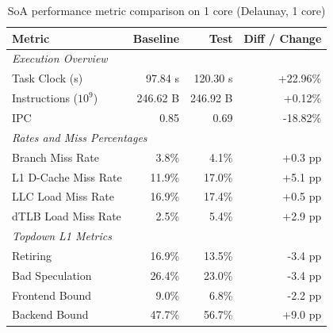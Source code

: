         \begin{table}[htbp]
      \centering
      \caption{SoA performance metric comparison on 1 core (Delaunay, 1 core)}
      \label{tab:perf_comparison_soa_delaunay_1core}
      \begin{tabular}{lrrr}
        \toprule
        \textbf{Metric} & \textbf{Baseline} & \textbf{Test} & \textbf{Diff / Change} \\
        \midrule
        \multicolumn{4}{l}{\textit{Execution Overview}} \\
        \quad Task Clock (s)           & 97.84 s   & 120.30 s   & +22.96\%   \\
        \quad Instructions ($10^9$)    & 246.62 B  & 246.92 B  & +0.12\%   \\
        \quad IPC                      & 0.85       & 0.69       & -18.82\%    \\
        \midrule
        \multicolumn{4}{l}{\textit{Rates and Miss Percentages}} \\
        \quad Branch Miss Rate         & 3.8\%      & 4.1\%      & +0.3 pp     \\
        \quad L1 D-Cache Miss Rate     & 11.9\%      & 17.0\%      & +5.1 pp    \\
        \quad LLC Load Miss Rate       & 16.9\%     & 17.4\%     & +0.5 pp    \\
        \quad dTLB Load Miss Rate      & 2.5\%      & 5.4\%      & +2.9 pp     \\
        \midrule
        \multicolumn{4}{l}{\textit{Topdown L1 Metrics}} \\
        \quad Retiring                 & 16.9\%     & 13.5\%     & -3.4 pp   \\
        \quad Bad Speculation          & 26.4\%     & 23.0\%     & -3.4 pp   \\
        \quad Frontend Bound           & 9.0\%     & 6.8\%     & -2.2 pp   \\
        \quad Backend Bound            & 47.7\%     & 56.7\%     & +9.0 pp   \\
        \bottomrule
      \end{tabular}
    \end{table}

